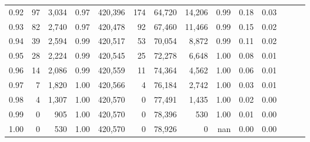 \begin{tabular}{rrrrrrrrrrrrrr}
0.92 &     97 &  3,034 &  0.97 &  420,396 &      174 &  64,720 &  14,206 &  0.99 &  0.18 &      0.03 \\
0.93 &     82 &  2,740 &  0.97 &  420,478 &       92 &  67,460 &  11,466 &  0.99 &  0.15 &      0.02 \\
0.94 &     39 &  2,594 &  0.99 &  420,517 &       53 &  70,054 &   8,872 &  0.99 &  0.11 &      0.02 \\
0.95 &     28 &  2,224 &  0.99 &  420,545 &       25 &  72,278 &   6,648 &  1.00 &  0.08 &      0.01 \\
0.96 &     14 &  2,086 &  0.99 &  420,559 &       11 &  74,364 &   4,562 &  1.00 &  0.06 &      0.01 \\
0.97 &      7 &  1,820 &  1.00 &  420,566 &        4 &  76,184 &   2,742 &  1.00 &  0.03 &      0.01 \\
0.98 &      4 &  1,307 &  1.00 &  420,570 &        0 &  77,491 &   1,435 &  1.00 &  0.02 &      0.00 \\
0.99 &      0 &    905 &  1.00 &  420,570 &        0 &  78,396 &     530 &  1.00 &  0.01 &      0.00 \\
1.00 &      0 &    530 &  1.00 &  420,570 &        0 &  78,926 &       0 &   nan &  0.00 &      0.00 \\
\bottomrule
\end{tabular}
